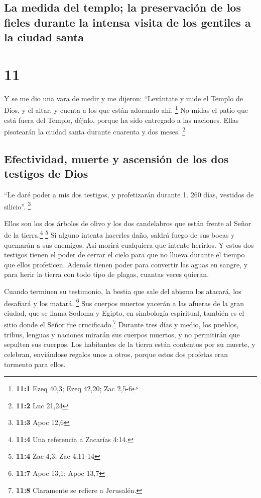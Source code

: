 \hypertarget{la-medida-del-templo-la-preservaciuxf3n-de-los-fieles-durante-la-intensa-visita-de-los-gentiles-a-la-ciudad-santa}{%
\subsection{La medida del templo; la preservación de los fieles durante
la intensa visita de los gentiles a la ciudad
santa}\label{la-medida-del-templo-la-preservaciuxf3n-de-los-fieles-durante-la-intensa-visita-de-los-gentiles-a-la-ciudad-santa}}

\hypertarget{section-10}{%
\section{11}\label{section-10}}

 Y se me dio una vara de medir y me dijeron: ``Levántate y
mide el Templo de Dios, y el altar, y cuenta a los que están adorando
ahí. \footnote{\textbf{11:1} Ezeq 40,3; Ezeq 42,20; Zac 2,5-6}
 No midas el patio que está fuera del Templo, déjalo,
porque ha sido entregado a las naciones. Ellas pisotearán la ciudad
santa durante cuarenta y dos meses. \footnote{\textbf{11:2} Luc 21,24}

\hypertarget{efectividad-muerte-y-ascensiuxf3n-de-los-dos-testigos-de-dios}{%
\subsection{Efectividad, muerte y ascensión de los dos testigos de
Dios}\label{efectividad-muerte-y-ascensiuxf3n-de-los-dos-testigos-de-dios}}

 ``Le daré poder a mis dos testigos, y profetizarán
durante 1. 260 días, vestidos de silicio''. \footnote{\textbf{11:3} Apoc
  12,6}

 Ellos son los dos árboles de olivo y los dos candelabros
que están frente al Señor de la tierra.\footnote{\textbf{11:4} Una
  referencia a Zacarías 4:14.} \footnote{\textbf{11:4} Zac 4,3; Zac
  4,11-14}  Si alguno intenta hacerles daño, saldrá fuego
de sus bocas y quemarán a sus enemigos. Así morirá cualquiera que
intente herirlos.  Y estos dos testigos tienen el poder de
cerrar el cielo para que no llueva durante el tiempo que ellos
profeticen. Además tienen poder para convertir las aguas en sangre, y
para herir la tierra con todo tipo de plagas, cuantas veces quieran.

 Cuando terminen su testimonio, la bestia que sale del
abismo los atacará, los desafiará y los matará. \footnote{\textbf{11:7}
  Apoc 13,1; Apoc 13,7}  Sus cuerpos muertos yacerán a las
afueras de la gran ciudad, que se llama Sodoma y Egipto, en simbología
espiritual, también es el sitio donde el Señor fue
crucificado.\footnote{\textbf{11:8} Claramente se refiere a Jerusalén.}
 Durante tres días y medio, los pueblos, tribus, lenguas y
naciones mirarán sus cuerpos muertos, y no permitirán que sepulten sus
cuerpos.  Los habitantes de la tierra están contentos por
su muerte, y celebran, enviándose regalos unos a otros, porque estos dos
profetas eran tormento para ellos.

